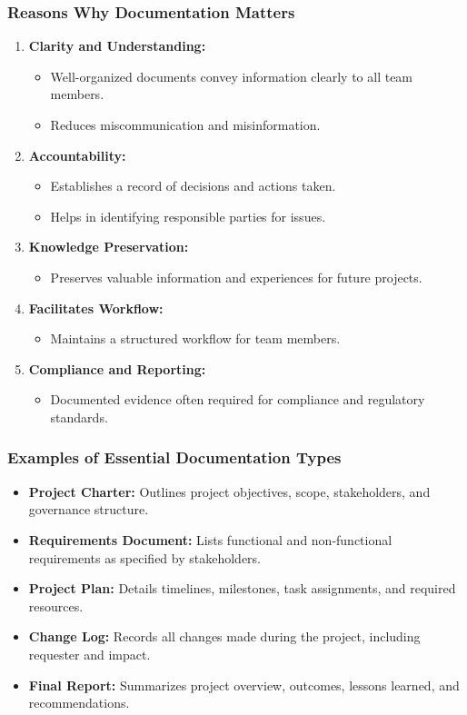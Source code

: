 \documentclass[aspectratio=169]{beamer}
\begin{document}
\begin{frame}[fragile]
    \frametitle{Reasons Why Documentation Matters}
    \begin{enumerate}
        \item \textbf{Clarity and Understanding:}
            \begin{itemize}
                \item Well-organized documents convey information clearly to all team members.
                \item Reduces miscommunication and misinformation.
            \end{itemize}
        \item \textbf{Accountability:}
            \begin{itemize}
                \item Establishes a record of decisions and actions taken.
                \item Helps in identifying responsible parties for issues.
            \end{itemize}
        \item \textbf{Knowledge Preservation:}
            \begin{itemize}
                \item Preserves valuable information and experiences for future projects.
            \end{itemize}
        \item \textbf{Facilitates Workflow:}
            \begin{itemize}
                \item Maintains a structured workflow for team members.
            \end{itemize}
        \item \textbf{Compliance and Reporting:}
            \begin{itemize}
                \item Documented evidence often required for compliance and regulatory standards.
            \end{itemize}
    \end{enumerate}
\end{frame}

\begin{frame}[fragile]
    \frametitle{Examples of Essential Documentation Types}
    \begin{itemize}
        \item \textbf{Project Charter:} Outlines project objectives, scope, stakeholders, and governance structure.
        \item \textbf{Requirements Document:} Lists functional and non-functional requirements as specified by stakeholders.
        \item \textbf{Project Plan:} Details timelines, milestones, task assignments, and required resources.
        \item \textbf{Change Log:} Records all changes made during the project, including requester and impact.
        \item \textbf{Final Report:} Summarizes project overview, outcomes, lessons learned, and recommendations.
    \end{itemize}
\end{frame}
\end{document}
